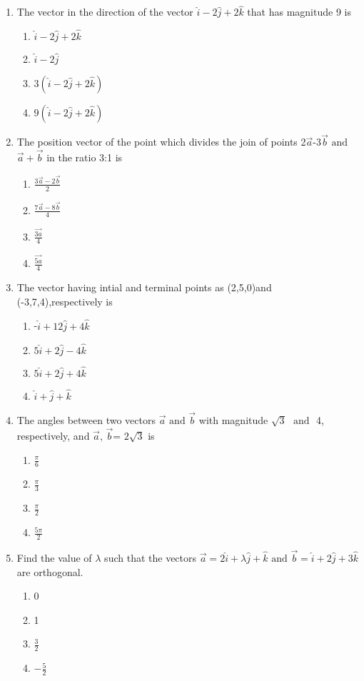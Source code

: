 \documentclass{article}
\begin{document}
\begin{enumerate}[resume]
\item The vector in the direction of the vector $\hat{i}-2\hat{j}+2\hat{k}$ that has magnitude 9 is
	\begin{enumerate}
\item $\hat{i}-2\hat{j}+2\hat{k}$
\item $\hat{i}-2\hat{j}$
\item $3(\hat{i}-2\hat{j}+2\hat{k})$
\item $9(\hat{i}-2\hat{j}+2\hat{k})$
\end{enumerate}


\item The position vector of the point which divides the join of points 2$\vec{a}$-3$\vec{b}$ $\text{and}$ $\vec{a}+\vec{b}$ in the ratio 3:1 is
	\begin{enumerate}
\item $\frac{3\vec{a}-2\vec{b}}{2}$
\item $\frac{7\vec{a}-8\vec{b}}{4}$
\item $\frac{\vec{3a}}{4}$
\item $\frac{\vec{5a}}{4}$
\end{enumerate}



\item The vector having intial and terminal points as (2,5,0)and (-3,7,4),respectively is
	\begin{enumerate}
\item -$\hat{i}+12\hat{j}+4\hat{k}$
\item $5\hat{i}+2\hat{j}-4\hat{k}$
\item $5\hat{i}+2\hat{j}+4\hat{k}$
\item $\hat{i}+\hat{j}+\hat{k}$
\end{enumerate}


\item The angles between two vectors $\vec{a}$ $\text{and}$ $\vec{b}$ with magnitude $\sqrt{3}$ $\text{ and }$ 4, respectively, and $\vec{a}$, $\vec{b}$= $2\sqrt{3}$ is
	\begin{enumerate}
\item $\frac{\pi}{6}$
\item $\frac{\pi}{3}$
\item $\frac{\pi}{2}$ 
\item $\frac{5\pi}{2}$
\end{enumerate}

\item Find the value of $\lambda$ such that the vectors $\vec{a}=2\hat{i}+\lambda\hat{j}+\hat{k}$ $\text{and}$ $\vec{b}=\hat{i}+2\hat{j}+3\hat{k}$ are orthogonal.
	\begin{enumerate}
\item 0
\item 1 
\item $\frac{3}{2}$
\item $-\frac{5}{2}$
	\end{enumerate}


\end{enumerate}
\end{document}
